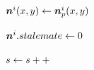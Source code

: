 \begin{algorithm}[tb!]
\begin{algorithmic}[1]
                            \If{$ \nodeListEachStalemate < \stalemateMax $}

                                \State $ \bm{n}^i(x,y) \gets \bm{n}^i_{p}(x,y) $

                            \Else

                                \State {}
                                \State $ \bm{n}^i.stalemate \gets 0 $ 

                            \EndIf
                            
                        \EndIf

                    \EndIf

                \EndFor

            \EndWhile

            \State $ s \gets s ++$

        \EndWhile

        \EndProcedure
    \end{algorithmic}
\end{algorithm}








